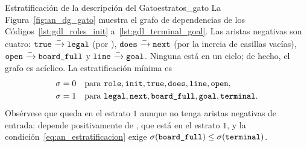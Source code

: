 \begin{ejemplo}{Estratificación de la descripción del Gato}{estratos_gato}
La Figura~\ref{fig:an_dg_gato} muestra el grafo de dependencias de los Códigos~\ref{lst:gdl_roles_init} a~\ref{lst:gdl_terminal_goal}. Las aristas negativas son cuatro: $\texttt{true} \xrightarrow{-} \texttt{legal}$ (por ), $\texttt{does} \xrightarrow{-} \texttt{next}$ (por la inercia de casillas vacías), $\texttt{open} \xrightarrow{-} \texttt{board\_full}$ y $\texttt{line} \xrightarrow{-} \texttt{goal}$. Ninguna está en un ciclo; de hecho, el grafo es acíclico. La estratificación mínima es
\begin{align*}
    \sigma &= 0 \quad \text{para } \texttt{role}, \texttt{init}, \texttt{true}, \texttt{does}, \texttt{line}, \texttt{open},\\
    \sigma &= 1 \quad \text{para } \texttt{legal}, \texttt{next}, \texttt{board\_full}, \texttt{goal}, \texttt{terminal}.
\end{align*}
Obsérvese que  queda en el estrato $1$ aunque no tenga aristas negativas de entrada: depende positivamente de , que está en el estrato $1$, y la condición~\eqref{eq:an_estratificacion} exige $\sigma(\texttt{board\_full}) \le \sigma(\texttt{terminal})$.
\end{ejemplo}

